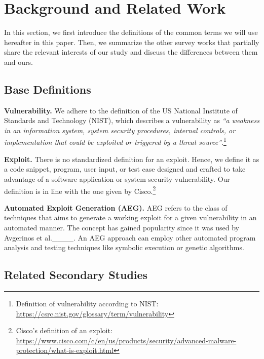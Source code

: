 \section{Background and Related Work}
\label{sec:background}
In this section, we first introduce the definitions of the common terms we will use hereafter in this paper. Then, we summarize the other survey works that partially share the relevant interests of our study and discuss the differences between them and ours.

\subsection{Base Definitions}
\label{subsec:definitions}
\noindent\textbf{Vulnerability.} We adhere to the definition of the US National Institute of Standards and Technology (NIST), which describes a vulnerability as \textit{``a weakness in an information system, system security procedures, internal controls, or implementation that could be exploited or triggered by a threat source''}.\footnote{Definition of vulnerability according to NIST: \url{https://csrc.nist.gov/glossary/term/vulnerability}}

\noindent\textbf{Exploit.} There is no standardized definition for an exploit. Hence, we define it as a code snippet, program, user input, or test case designed and crafted to take advantage of a software application or system security vulnerability. Our definition is in line with the one given by Cisco.\footnote{Cisco's definition of an exploit: \url{https://www.cisco.com/c/en/us/products/security/advanced-malware-protection/what-is-exploit.html}}

\noindent\textbf{Automated Exploit Generation (AEG).} AEG refers to the class of techniques that aims to generate a working exploit for a given vulnerability in an automated manner.
The concept has gained popularity since it was used by Avgerinos et al.____.
An AEG approach can employ other automated program analysis and testing techniques like symbolic execution or genetic algorithms.
{}
{}


\subsection{Related Secondary Studies}
\label{subsec:related}

